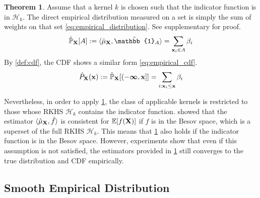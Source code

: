 \documentclass[twoside]{article} \usepackage{aistats2017}
\theoremstyle{definition}
\theoremstyle{theorem}
\newtheorem{theorem}{Theorem}[section]
\newcommand{\rv}[1]{{#1}}
\newcommand{\inner}[2]{{\langle #1, #2 \rangle}}
\begin{document}
		\begin{theorem} \label{thm:empirical_distribution_and_cdf}
			Assume that a kernel $k$ is chosen such that the indicator function is in $\mathcal{H}_{k}$. The direct empirical distribution measured on a set is simply the sum of weights on that set \eqref{eq:empirical_distribution}. See supplementary for proof.
			\begin{equation}
				\hat{\mathbb{P}}_{\bvec{\rv{X}}}[A] := \inner{\hat{\mu}_{\bvec{\rv{X}}}}{ \hat{\mathbb{1}}_{A}} = \sum_{\bvec{x}_{i} \in A} \beta_{i}
			\label{eq:empirical_distribution}
			\end{equation}
			By \cref{def:cdf}, the CDF shows a similar form \eqref{eq:empirical_cdf}.
			\begin{equation}
				\hat{P}_{\bvec{\rv{X}}}(\bvec{x}) := \hat{\mathbb{P}}_{\bvec{\rv{X}}}[(-\bm{\infty}, \bvec{x}]] = \sum_{i : \bvec{x}_{i} \leq \bvec{x}} \beta_{i}
			\label{eq:empirical_cdf}
			\end{equation}
		\end{theorem}

		Nevertheless, in order to apply \cref{thm:empirical_distribution_and_cdf}, the class of applicable kernels is restricted to those whose RKHS $\mathcal{H}_{k}$ contains the indicator function. \cite{kanagawa2014recovering} showed that the estimator $\langle \hat{\mu}_{\bvec{\rv{X}}}, \hat{f} \rangle$ is consistent for $\mathbb{E}[f(\bvec{\rv{X}})]$ if $f$ is in the Besov space, which is a superset of the full RKHS $\mathcal{H}_{k}$. This means that \cref{thm:empirical_distribution_and_cdf} also holds if the indicator function is in the Besov space. However, experiments show that even if this assumption is not satisfied, the estimators provided in \cref{thm:empirical_distribution_and_cdf} still converges to the true distribution and CDF empirically.

	\subsection{Smooth Empirical Distribution}
	\label{sec:direct_quantile_regression:smooth_empirical_distribution}
\end{document}
